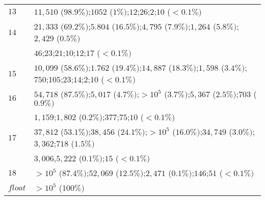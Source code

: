 \begin{table*}[!t]
\begin{tabular}{l  l  }
		$13$    & $11,510$ {\scriptsize($ 98.9\%)$};$1052$ {\scriptsize($1 \%)$};$12$;$26$;$2$;$10$ {\scriptsize($<0.1\% )$}                                                                                                                 \\
		$14$    & $21,333$ {\scriptsize($69.2\% )$};$5.804$ {\scriptsize($16.5\%  )$};$4,795$ {\scriptsize($7.9\%  )$};$1,264$ {\scriptsize($5.8 \% )$};$2,429$ {\scriptsize($0.5\% )$}                                                      \\
		& $46$;$23$;$21$;$10$;$12$;$17$ {\scriptsize($<0.1\%  )$}                                                                                                                                                                    \\
		$15$    & $10,099$ {\scriptsize($58.6 \%)$};$1.762$ {\scriptsize($19.4 \%)$};$14,887$ {\scriptsize($18.3\%)$};$1,598$ {\scriptsize($3.4\%)$};$750$;$105$;$23$;$14$;$2$;$10$ {\scriptsize($<0.1\%)$}                                  \\
		$16$    & $54,718$ {\scriptsize($87.5\% )$};$5,017$ {\scriptsize($4.7\% )$};$>10^5$ {\scriptsize($3.7\% )$};$5,367$ {\scriptsize($2.5\% )$};$703$ {\scriptsize($0.9\% )$}                                                            \\
		& $1,159$;$1,802$ {\scriptsize($0.2\% )$};$377$;$75$;$10$ {\scriptsize($<0.1\%  )$}                                                                                                                                          \\
		$17$    & $37,812$ {\scriptsize($53.1\% )$};$38,456$ {\scriptsize($24.1\% )$};$>10^5$ {\scriptsize($16.0\%)$};$34,749$ {\scriptsize($3.0\% )$};$3,362$;$718$ {\scriptsize($1.5\%)$}                                                  \\
		& $3,006$,$5,222$ {\scriptsize($0.1\% )$};$15$ {\scriptsize($<0.1 \%)$}                                                                                                                                                      \\
		$18$    & $>10^5$ {\scriptsize($87.4\%)$};$52,069$ {\scriptsize($12.5\% )$};$2,471$ {\scriptsize($0.1\% )$};$146$;$51$ {\scriptsize($<0.1 \%)$}                                                                                      \\
		$float$ & $>10^5$ {\scriptsize($100\% )$}                                                                                                                                                                                            \\ \hline
	\end{tabular}
	
\end{table*}

